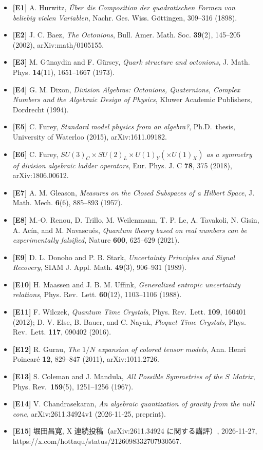 \documentclass[
  a4paper,
]{ltjsarticle}
\providecommand{\tightlist}{%
  \setlength{\itemsep}{0pt}\setlength{\parskip}{0pt}}
\begin{document}
\begin{itemize}
\tightlist
\item
  \textbf{{[}E1{]}} A. Hurwitz, \emph{Über die Composition der
  quadratischen Formen von beliebig vielen Variablen}, Nachr. Ges. Wiss.
  Göttingen, 309--316 (1898).
\item
  \textbf{{[}E2{]}} J. C. Baez, \emph{The Octonions}, Bull. Amer. Math.
  Soc. \textbf{39}(2), 145--205 (2002), arXiv:math/0105155.
\item
  \textbf{{[}E3{]}} M. Günaydin and F. Gürsey, \emph{Quark structure and
  octonions}, J. Math. Phys. \textbf{14}(11), 1651--1667 (1973).
\item
  \textbf{{[}E4{]}} G. M. Dixon, \emph{Division Algebras: Octonions,
  Quaternions, Complex Numbers and the Algebraic Design of Physics},
  Kluwer Academic Publishers, Dordrecht (1994).
\item
  \textbf{{[}E5{]}} C. Furey, \emph{Standard model physics from an
  algebra?}, Ph.D.~thesis, University of Waterloo (2015),
  arXiv:1611.09182.
\item
  \textbf{{[}E6{]}} C. Furey,
  \emph{\(SU(3)_C \times SU(2)_L \times U(1)_Y (\times U(1)_X)\) as a
  symmetry of division algebraic ladder operators}, Eur. Phys. J. C
  \textbf{78}, 375 (2018), arXiv:1806.00612.
\item
  \textbf{{[}E7{]}} A. M. Gleason, \emph{Measures on the Closed
  Subspaces of a Hilbert Space}, J. Math. Mech. \textbf{6}(6), 885--893
  (1957).
\item
  \textbf{{[}E8{]}} M.-O. Renou, D. Trillo, M. Weilenmann, T. P. Le, A.
  Tavakoli, N. Gisin, A. Acín, and M. Navascués, \emph{Quantum theory
  based on real numbers can be experimentally falsified}, Nature
  \textbf{600}, 625--629 (2021).
\item
  \textbf{{[}E9{]}} D. L. Donoho and P. B. Stark, \emph{Uncertainty
  Principles and Signal Recovery}, SIAM J. Appl. Math. \textbf{49}(3),
  906--931 (1989).
\item
  \textbf{{[}E10{]}} H. Maassen and J. B. M. Uffink, \emph{Generalized
  entropic uncertainty relations}, Phys. Rev.~Lett. \textbf{60}(12),
  1103--1106 (1988).
\item
  \textbf{{[}E11{]}} F. Wilczek, \emph{Quantum Time Crystals}, Phys.
  Rev.~Lett. \textbf{109}, 160401 (2012); D. V. Else, B. Bauer, and C.
  Nayak, \emph{Floquet Time Crystals}, Phys. Rev.~Lett. \textbf{117},
  090402 (2016).
\item
  \textbf{{[}E12{]}} R. Gurau, \emph{The \(1/N\) expansion of colored
  tensor models}, Ann. Henri Poincaré \textbf{12}, 829--847 (2011),
  arXiv:1011.2726.
\item
  \textbf{{[}E13{]}} S. Coleman and J. Mandula, \emph{All Possible
  Symmetries of the \(S\) Matrix}, Phys. Rev.~\textbf{159}(5),
  1251--1256 (1967).
\item
  \textbf{{[}E14{]}} V. Chandrasekaran, \emph{An algebraic quantization
  of gravity from the null cone}, arXiv:2611.34924v1 (2026-11-25,
  preprint).
\item
  \textbf{{[}E15{]}} 堀田昌寛, X 連続投稿（arXiv:2611.34924
  に関する講評）, 2026-11-27,
  https://x.com/hottaqu/status/2126098332707930567.
\end{itemize}
\end{document}
